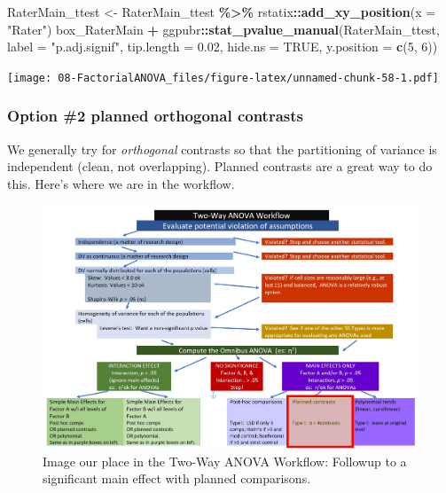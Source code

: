 \documentclass[
  11pt,
]{book}
\newenvironment{Shaded}{\begin{snugshade}}{\end{snugshade}}
\newcommand{\AttributeTok}[1]{\textcolor[rgb]{0.27,0.27,0.27}{#1}}
\newcommand{\ConstantTok}[1]{\textcolor[rgb]{0.37,0.37,0.37}{#1}}
\newcommand{\DecValTok}[1]{\textcolor[rgb]{0.06,0.06,0.06}{#1}}
\newcommand{\FloatTok}[1]{\textcolor[rgb]{0.06,0.06,0.06}{#1}}
\newcommand{\FunctionTok}[1]{\textcolor[rgb]{0.27,0.27,0.27}{\textbf{#1}}}
\newcommand{\NormalTok}[1]{#1}
\newcommand{\OtherTok}[1]{\textcolor[rgb]{0.37,0.37,0.37}{#1}}
\newcommand{\SpecialCharTok}[1]{\textcolor[rgb]{0.43,0.43,0.43}{\textbf{#1}}}
\newcommand{\StringTok}[1]{\textcolor[rgb]{0.5,0.5,0.5}{#1}}
\begin{document}
\begin{Shaded}
\begin{Highlighting}[]
\NormalTok{RaterMain\_ttest }\OtherTok{\textless{}{-}}\NormalTok{ RaterMain\_ttest }\SpecialCharTok{\%\textgreater{}\%}
\NormalTok{    rstatix}\SpecialCharTok{::}\FunctionTok{add\_xy\_position}\NormalTok{(}\AttributeTok{x =} \StringTok{"Rater"}\NormalTok{)}
\NormalTok{box\_RaterMain }\SpecialCharTok{+}\NormalTok{ ggpubr}\SpecialCharTok{::}\FunctionTok{stat\_pvalue\_manual}\NormalTok{(RaterMain\_ttest, }\AttributeTok{label =} \StringTok{"p.adj.signif"}\NormalTok{,}
    \AttributeTok{tip.length =} \FloatTok{0.02}\NormalTok{, }\AttributeTok{hide.ns =} \ConstantTok{TRUE}\NormalTok{, }\AttributeTok{y.position =} \FunctionTok{c}\NormalTok{(}\DecValTok{5}\NormalTok{, }\DecValTok{6}\NormalTok{))}
\end{Highlighting}
\end{Shaded}

\texttt{[image: 08-FactorialANOVA\_files/figure-latex/unnamed-chunk-58-1.pdf]}

\hypertarget{option-2-planned-orthogonal-contrasts}{%
\subsubsection{Option \#2 planned orthogonal contrasts}\label{option-2-planned-orthogonal-contrasts}}

We generally try for \emph{orthogonal} contrasts so that the partitioning of variance is independent (clean, not overlapping). Planned contrasts are a great way to do this. Here's where we are in the workflow.

\begin{figure}
\centering
\includegraphics{images/factorial/wfMain_Plnd.jpg}
\caption{Image our place in the Two-Way ANOVA Workflow: Followup to a significant main effect with planned comparisons.}
\end{figure}
\end{document}
